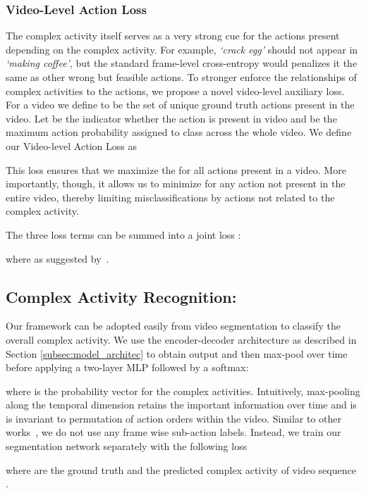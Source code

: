 \documentclass[10pt,twocolumn,letterpaper]{article}
\begin{document}
\subsubsection{Video-Level Action Loss }\label{subsec:action_loss} 
The complex activity itself serves as a very strong cue for the actions present depending on the complex activity.  For example, \emph{`crack egg'} should not appear in \emph{`making coffee'}, but the standard frame-level cross-entropy would penalizes it the same as other wrong but feasible actions. 
To stronger enforce the relationships of complex activities to the actions, we propose a novel video-level auxiliary loss.
For a video  we define  to be the set of unique ground truth actions present in the video. Let  be the indicator whether the action  is present in video  and  be the maximum action probability assigned to class  across the whole video. We define our {Video-level Action Loss} as

This loss ensures that we maximize the  for all actions present in a video.  More importantly, though, it allows us to minimize  for any action  not present in the entire video, thereby limiting misclassifications by actions not related to the complex activity.

The three loss terms can be summed into a joint loss :

where  as suggested by~\cite{li2020ms, farha2019ms}.

\subsection{Complex Activity Recognition:} 
Our framework can be adopted easily from video segmentation to classify the overall complex activity.  We use the encoder-decoder architecture as described in Section \ref{subsec:model_architec} to obtain output  and then max-pool over time before applying a two-layer MLP followed by a softmax:


\noindent where  is the probability vector for the  complex activities.  Intuitively, max-pooling along the temporal dimension retains the important information over time and is is invariant to permutation of action orders within the video.
Similar to other works~\cite{highlevel-hussein2019timeception, highlevel-hussein2020pic}, we do not use any frame wise sub-action labels.  Instead, we train our segmentation network separately with the following loss


\noindent where  are the ground truth and the predicted complex activity of video sequence .
\end{document}
